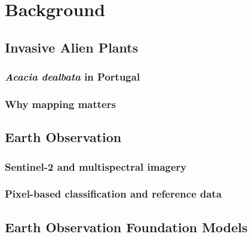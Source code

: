 \chapter{Background}
\label{sec:background}


\section{Invasive Alien Plants}
\label{sec:background-iap}

\subsection{\emph{Acacia dealbata} in Portugal}
\label{sec:background-iap-acacia}

\subsection{Why mapping matters}
\label{sec:background-iap-mapping}

\section{Earth Observation}
\label{sec:background-eo}

\subsection{Sentinel-2 and multispectral imagery}
\label{sec:background-eo-sentinel2}

\subsection{Pixel-based classification and reference data}
\label{sec:background-eo-classification}

\section{Earth Observation Foundation Models}
\label{sec:background-fm}

